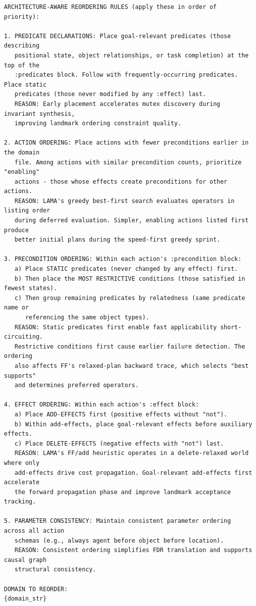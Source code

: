 \documentclass[
  numbers=noenddot,
  english,  %
  a4paper,  %
  oneside,  %
  bibliography=totoc,
  headsepline,
  cleardoublepage=empty,
  parskip=half,
  draft=false
]{scrbook}
\theoremstyle{break}
\begin{document}
\begin{lstlisting}[language={}, caption={Architecture-aware prompt for LAMA-first.}, label={lst:prompt:lama}, basicstyle=\small\ttfamily, numbers=none, frame=single, breaklines=true]
ARCHITECTURE-AWARE REORDERING RULES (apply these in order of priority):

1. PREDICATE DECLARATIONS: Place goal-relevant predicates (those describing
   positional state, object relationships, or task completion) at the top of the
   :predicates block. Follow with frequently-occurring predicates. Place static
   predicates (those never modified by any :effect) last.
   REASON: Early placement accelerates mutex discovery during invariant synthesis,
   improving landmark ordering constraint quality.

2. ACTION ORDERING: Place actions with fewer preconditions earlier in the domain
   file. Among actions with similar precondition counts, prioritize "enabling"
   actions - those whose effects create preconditions for other actions.
   REASON: LAMA's greedy best-first search evaluates operators in listing order
   during deferred evaluation. Simpler, enabling actions listed first produce
   better initial plans during the speed-first greedy sprint.

3. PRECONDITION ORDERING: Within each action's :precondition block:
   a) Place STATIC predicates (never changed by any effect) first.
   b) Then place the MOST RESTRICTIVE conditions (those satisfied in fewest states).
   c) Then group remaining predicates by relatedness (same predicate name or
      referencing the same object types).
   REASON: Static predicates first enable fast applicability short-circuiting.
   Restrictive conditions first cause earlier failure detection. The ordering
   also affects FF's relaxed-plan backward trace, which selects "best supports"
   and determines preferred operators.

4. EFFECT ORDERING: Within each action's :effect block:
   a) Place ADD-EFFECTS first (positive effects without "not").
   b) Within add-effects, place goal-relevant effects before auxiliary effects.
   c) Place DELETE-EFFECTS (negative effects with "not") last.
   REASON: LAMA's FF/add heuristic operates in a delete-relaxed world where only
   add-effects drive cost propagation. Goal-relevant add-effects first accelerate
   the forward propagation phase and improve landmark acceptance tracking.

5. PARAMETER CONSISTENCY: Maintain consistent parameter ordering across all action
   schemas (e.g., always agent before object before location).
   REASON: Consistent ordering simplifies FDR translation and supports causal graph
   structural consistency.

DOMAIN TO REORDER:
{domain_str}
\end{lstlisting}
\end{document}
